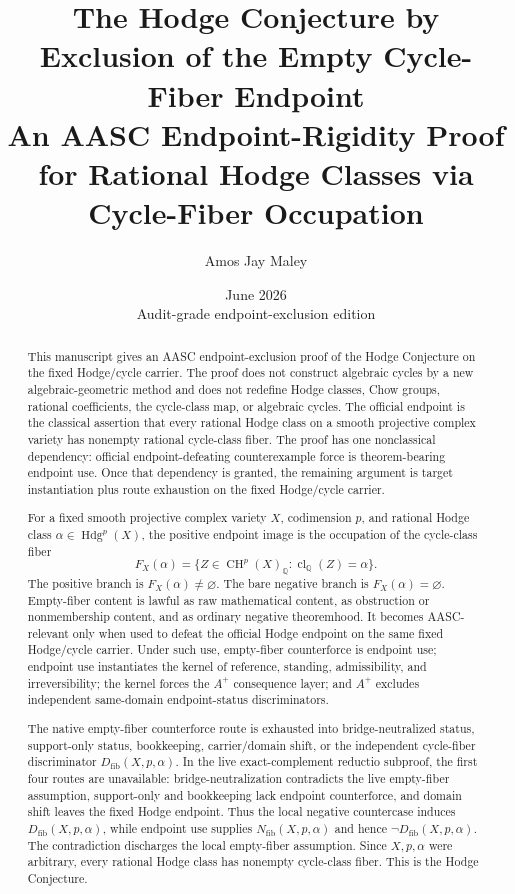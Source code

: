 \documentclass[11pt]{article}
\title{\textbf{The Hodge Conjecture by Exclusion of the Empty Cycle-Fiber Endpoint}\\[0.25em]
\large An AASC Endpoint-Rigidity Proof for Rational Hodge Classes via Cycle-Fiber Occupation}
\author{Amos Jay Maley}
\date{June 2026\\Audit-grade endpoint-exclusion edition}
\newcommand{\QQ}{\mathbb{Q}}
\newcommand{\CH}{\operatorname{CH}}
\newcommand{\Hdg}{\operatorname{Hdg}}
\newcommand{\clQ}{\operatorname{cl}_{\QQ}}
\begin{document}
\maketitle
\setcounter{tocdepth}{1}


\begin{abstract}
This manuscript gives an AASC endpoint-exclusion proof of the Hodge Conjecture on the fixed Hodge/cycle carrier. The proof does not construct algebraic cycles by a new algebraic-geometric method and does not redefine Hodge classes, Chow groups, rational coefficients, the cycle-class map, or algebraic cycles. The official endpoint is the classical assertion that every rational Hodge class on a smooth projective complex variety has nonempty rational cycle-class fiber. The proof has one nonclassical dependency: official endpoint-defeating counterexample force is theorem-bearing endpoint use. Once that dependency is granted, the remaining argument is target instantiation plus route exhaustion on the fixed Hodge/cycle carrier.

For a fixed smooth projective complex variety $X$, codimension $p$, and rational Hodge class $\alpha\in \Hdg^p(X)$, the positive endpoint image is the occupation of the cycle-class fiber
\[
F_X(\alpha)=\{Z\in \CH^p(X)_\QQ: \clQ(Z)=\alpha\}.
\]
The positive branch is $F_X(\alpha)\neq\varnothing$. The bare negative branch is $F_X(\alpha)=\varnothing$. Empty-fiber content is lawful as raw mathematical content, as obstruction or nonmembership content, and as ordinary negative theoremhood. It becomes AASC-relevant only when used to defeat the official Hodge endpoint on the same fixed Hodge/cycle carrier. Under such use, empty-fiber counterforce is endpoint use; endpoint use instantiates the kernel of reference, standing, admissibility, and irreversibility; the kernel forces the $A^+$ consequence layer; and $A^+$ excludes independent same-domain endpoint-status discriminators.

The native empty-fiber counterforce route is exhausted into bridge-neutralized status, support-only status, bookkeeping, carrier/domain shift, or the independent cycle-fiber discriminator $D_{\mathrm{fib}}(X,p,\alpha)$. In the live exact-complement reductio subproof, the first four routes are unavailable: bridge-neutralization contradicts the live empty-fiber assumption, support-only and bookkeeping lack endpoint counterforce, and domain shift leaves the fixed Hodge endpoint. Thus the local negative countercase induces $D_{\mathrm{fib}}(X,p,\alpha)$, while endpoint use supplies $N_{\mathrm{fib}}(X,p,\alpha)$ and hence $\neg D_{\mathrm{fib}}(X,p,\alpha)$. The contradiction discharges the local empty-fiber assumption. Since $X,p,\alpha$ were arbitrary, every rational Hodge class has nonempty cycle-class fiber. This is the Hodge Conjecture.
\end{abstract}
\tableofcontents
\newpage
\end{document}
